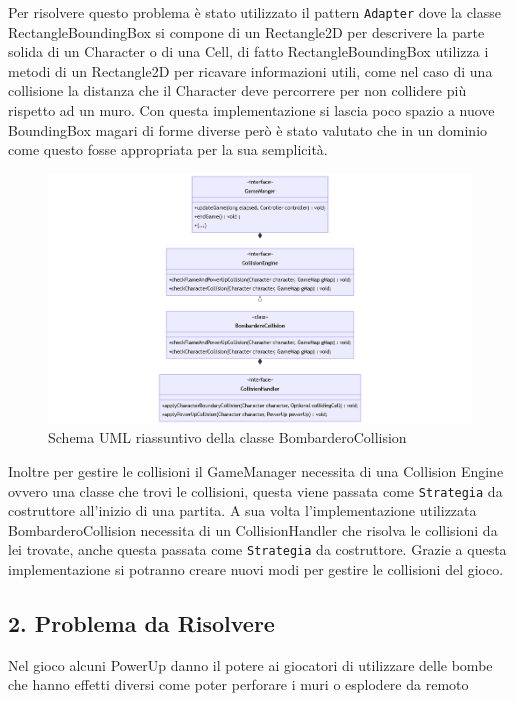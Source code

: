 \documentclass[a4paper,12pt]{report}
\begin{document}
\par
Per risolvere questo problema è stato utilizzato il pattern \verb|Adapter| dove la classe RectangleBoundingBox si compone di un Rectangle2D per descrivere la parte solida di un Character o di una Cell, di fatto RectangleBoundingBox utilizza i metodi di un Rectangle2D per ricavare informazioni utili, come nel caso di una collisione la distanza che il Character deve percorrere per non collidere più rispetto ad un muro.
Con questa implementazione si lascia poco spazio a nuove BoundingBox magari di forme diverse però è stato valutato che in un dominio come questo fosse appropriata per la sua semplicità.


\begin{figure}[H]
\centering{}
\includegraphics[width=\textwidth]{img/CollisionEngine.png}
\caption{Schema UML riassuntivo della classe BombarderoCollision}
\end{figure}

\par
Inoltre per gestire le collisioni il GameManager necessita di una Collision Engine ovvero una classe che trovi le collisioni, questa viene passata come \verb|Strategia| da costruttore all'inizio di una partita. A sua volta l'implementazione utilizzata BombarderoCollision necessita di un CollisionHandler che risolva le collisioni da lei trovate, anche questa passata come \verb|Strategia| da costruttore. Grazie a questa implementazione si potranno creare nuovi modi per gestire le collisioni del gioco.

\subsection*{2. Problema da Risolvere}
\par
Nel gioco alcuni PowerUp danno il potere ai giocatori di utilizzare delle bombe che hanno effetti diversi come poter perforare i muri o esplodere da remoto
\end{document}
